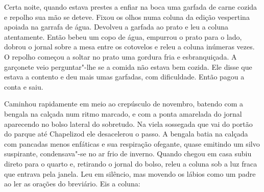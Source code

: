 Certa noite, quando estava prestes a enfiar na boca uma garfada de carne cozida
e repolho sua mão se deteve.  Fixou os olhos numa coluna da edição
vespertina apoiada na garrafa de água.  Devolveu a garfada ao prato e leu a
coluna atentamente.  Então bebeu um copo de água, empurrou o prato para o lado,
dobrou o jornal sobre a mesa entre os cotovelos e releu a coluna inúmeras
vezes.  O repolho começou a soltar no prato uma gordura fria e esbranquiçada.
A garçonete veio perguntar"-lhe se a comida não estava bem cozida.  Ele disse
que estava a contento e deu mais umas garfadas, com dificuldade.  Então pagou a
conta e saiu.

Caminhou rapidamente em meio ao crepúsculo de novembro, batendo com a bengala
na calçada num ritmo marcado, e com a ponta amarelada do jornal aparecendo no
bolso lateral do sobretudo.  Na viela sossegada que vai do portão do parque até
Chapelizod ele desacelerou o passo.  A bengala batia na calçada com pancadas
menos enfáticas e sua respiração ofegante, quase emitindo um silvo suspirante,
condensava"-se no ar frio de inverno.  Quando chegou em casa subiu direto para o
quarto e, retirando o jornal do bolso, releu a coluna sob a luz fraca que
entrava pela janela.  Leu em silêncio, mas movendo os lábios como um padre ao
ler as orações do breviário.  Eis a coluna:


